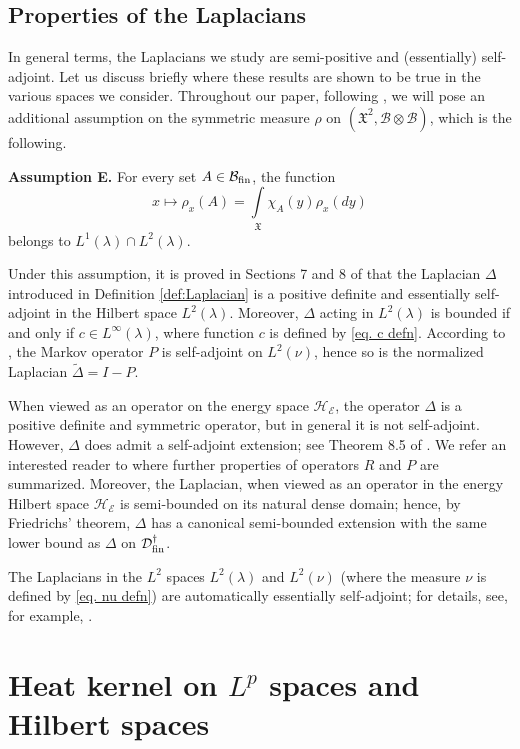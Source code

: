\documentclass[11pt,reqno]{amsart}
\theoremstyle{remark}
\theoremstyle{definition}
\numberwithin{theorem}{section} \numberwithin{equation}{section}
\newcommand{\D}{\mathcal{D}}
\newcommand{\HE}{\mathcal{H}_\mathcal{E}}
\newcommand{\X}{\mathfrak{X}}
\begin{document}
\medskip
\subsection{Properties of the Laplacians }
In general terms, the Laplacians we study are semi-positive and (essentially) self-adjoint.  Let us discuss briefly
where these results are shown to be true in the various spaces we consider.
 Throughout our paper, following \cite{BJ19a}, we will pose an
additional assumption on the symmetric measure $\rho$ on  $(\X^2,\mathcal{B}\otimes \mathcal{B})$, which is the following.
\medskip

\textbf{Assumption E. } For every set $A\in\mathcal{B}_{\rm fin}$, the function
$$
x\mapsto \rho_x(A)=\int\limits_{\X}\chi_A(y)\rho_x(dy)
$$
belongs to $L^1(\lambda)\cap L^2(\lambda)$.

\medskip
\noindent
Under this assumption, it is proved in Sections 7 and 8 of \cite{BJ19a} that the Laplacian $\Delta$ introduced in Definition \ref{def:Laplacian} is a positive definite
and essentially self-adjoint in the
Hilbert space $L^2(\lambda)$. Moreover, $\Delta$ acting in $L^2(\lambda)$ is bounded if and only if
$c\in L^{\infty}(\lambda)$, where function $c$ is defined by \eqref{eq. c defn}.
According to \cite[Lemma 3.5]{JP19}, the Markov operator $P$ is self-adjoint on $L^2(\nu)$, hence so is the normalized Laplacian $\tilde \Delta=I-P$.

When viewed as an operator on the energy space $\HE$, the operator $\Delta$ is a positive definite and symmetric operator, but in general it is not
 self-adjoint.  However, $\Delta$ does admit a self-adjoint extension; see Theorem 8.5 of \cite{BJ19a}.  We refer an interested reader to
 \cite[Theorem 2.14]{BJ23} where further properties of operators $R$ and $P$ are summarized.  Moreover, the Laplacian, when viewed as an operator
 in the energy Hilbert space $\HE$  is semi-bounded on its natural dense domain; hence, by Friedrichs’ theorem, $\Delta$ has a canonical semi-bounded
 extension with the same lower bound as $\Delta$ on $\D_{\rm fin}^{\dagger}$.

The Laplacians in the $L^2$ spaces $L^2(\lambda)$ and $L^2(\nu)$ (where the measure $\nu$ is defined by \eqref{eq. nu defn}) are automatically essentially self-adjoint; for details,
see, for example, \cite{JP17, JP19, JPT18}.


\medskip
\section{Heat kernel on $L^{p}$ spaces and Hilbert spaces}
\end{document}
